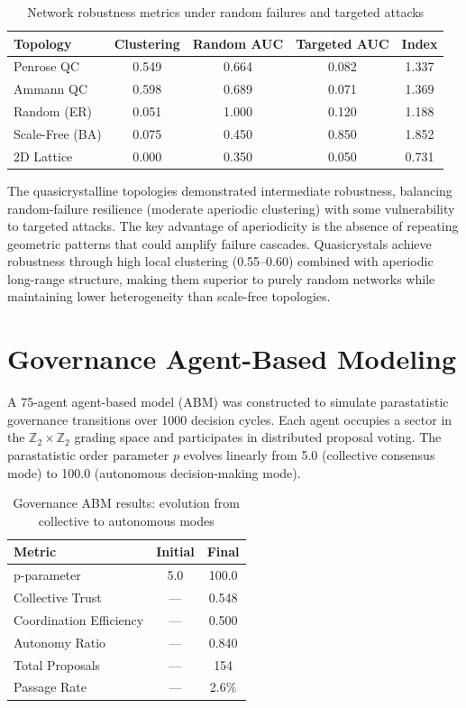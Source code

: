 \documentclass[smallextended]{svjour3}
\begin{document}
\begin{table}[t]
\centering
\caption{Network robustness metrics under random failures and targeted attacks}
\begin{tabular}{lcccc}
\hline
Topology & Clustering & Random AUC & Targeted AUC & Index \\
\hline
Penrose QC & 0.549 & 0.664 & 0.082 & 1.337 \\
Ammann QC & 0.598 & 0.689 & 0.071 & 1.369 \\
Random (ER) & 0.051 & 1.000 & 0.120 & 1.188 \\
Scale-Free (BA) & 0.075 & 0.450 & 0.850 & 1.852 \\
2D Lattice & 0.000 & 0.350 & 0.050 & 0.731 \\
\hline
\end{tabular}
\end{table}

The quasicrystalline topologies demonstrated intermediate robustness, balancing random-failure resilience (moderate aperiodic clustering) with some vulnerability to targeted attacks. The key advantage of aperiodicity is the absence of repeating geometric patterns that could amplify failure cascades. Quasicrystals achieve robustness through high local clustering (0.55–0.60) combined with aperiodic long-range structure, making them superior to purely random networks while maintaining lower heterogeneity than scale-free topologies.

\section{Governance Agent-Based Modeling}

A 75-agent agent-based model (ABM) was constructed to simulate parastatistic governance transitions over 1000 decision cycles. Each agent occupies a sector in the $\mathbb{Z}_2 \times \mathbb{Z}_2$ grading space and participates in distributed proposal voting. The parastatistic order parameter $p$ evolves linearly from 5.0 (collective consensus mode) to 100.0 (autonomous decision-making mode).

\begin{table}[t]
\centering
\caption{Governance ABM results: evolution from collective to autonomous modes}
\begin{tabular}{lcc}
\hline
Metric & Initial & Final \\
\hline
p-parameter & 5.0 & 100.0 \\
Collective Trust & --- & 0.548 \\
Coordination Efficiency & --- & 0.500 \\
Autonomy Ratio & --- & 0.840 \\
Total Proposals & --- & 154 \\
Passage Rate & --- & 2.6\% \\
\hline
\end{tabular}
\end{table}
\end{document}
